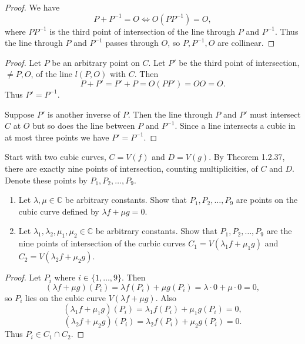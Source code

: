 \begin{proof}
    We have
    \[
        P + P^{-1} = O \iff O(P P^{-1}) = O,
    \]
    where $P P^{-1}$ is the third point of intersection of the line through $P$ and $P^{-1}$.  
    Thus the line through $P$ and $P^{-1}$ passes through $O$,  
        so $P, P^{-1}, O$ are collinear.
\end{proof}

\begin{proof}
    Let $P$ be an arbitrary point on $C$.  
    Let $P'$ be the third point of intersection, $\ne P, O$, of the line $l(P, O)$ with $C$.  
    Then
    \[
        P + P' = P' + P = O(P P') = OO = O.
    \]
    Thus $P' = P^{-1}$.

    Suppose $P'$ is another inverse of $P$.
    Then the line through $P$ and $P'$ must intersect $C$ at $O$ but so does the line between $P$ and $P^{-1}$.  
    Since a line intersects a cubic in at most three points we have $P' = P^{-1}$.  
\end{proof}


\begin{tcolorbox}[title=Problem 10, breakable]
    Start with two cubic curves, $C = V(f)$ and $D = V(g)$.
    By Theorem 1.2.37, there are exactly nine points of intersection,
        counting multiplicities, of $C$ and $D$.
    Denote these points by $P_1, P_2, \ldots, P_9$.
    \begin{enumerate}
        \item Let $\lambda, \mu \in \mathbb{C}$ be arbitrary constants. Show that $P_1, P_2, \ldots, P_9$
        are points on the cubic curve defined by $\lambda f + \mu g = 0$.
        \item Let $\lambda_1, \lambda_2, \mu_1, \mu_2 \in \mathbb{C}$ be arbitrary constants.
        Show that $P_1, P_2, \ldots, P_9$ are the nine points of intersection of the curbic curves 
        $C_1 = V(\lambda_1 f + \mu_1 g)$ and $C_2 = V(\lambda_2 f + \mu_2 g)$.
    \end{enumerate}
\end{tcolorbox}

\begin{proof}
    Let $P_i$ where $i \in \{1, \ldots, 9\}$.  Then 
    \[
        (\lambda f + \mu g)(P_i) = \lambda f(P_i) + \mu g(P_i) = \lambda \cdot 0 + \mu \cdot 0 = 0,
    \]
    so $P_i$ lies on the cubic curve $V(\lambda f + \mu g)$.
    Also
    \[
        (\lambda_1 f + \mu_1 g)(P_i) = \lambda_1 f(P_i) + \mu_1 g(P_i) = 0,
    \]
    \[
        (\lambda_2 f + \mu_2 g)(P_i) = \lambda_2 f(P_i) + \mu_2 g(P_i) = 0.
    \]
    Thus $P_i \in C_1 \cap C_2$.
\end{proof}

